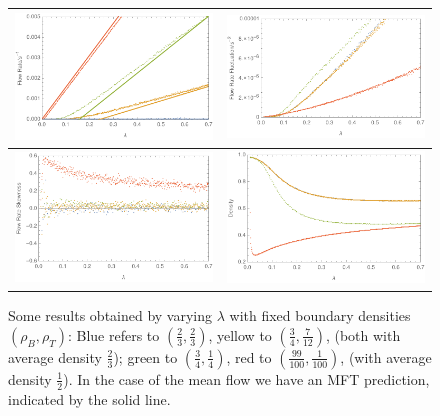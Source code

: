 \begin{figure}[h!]
\vspace{1em}
\caption{\label{fig:lambdaScans} Some results obtained by varying $\lambda$ with fixed boundary densities $(\rho_B, \rho_T)$: Blue refers to $(\frac{2}{3}, \frac{2}{3})$, yellow to $(\frac{3}{4}, \frac{7}{12})$, (both with average density $\frac{2}{3}$); green to
$(\frac{3}{4}, \frac{1}{4})$, red to $(\frac{99}{100}, \frac{1}{100})$, (with average density $\frac{1}{2}$). In the case of the mean flow we have an MFT prediction, indicated by the solid line.}
\begin{center}
 \begin{tabular}{c|c}
    \includegraphics[width=0.5\linewidth]{../tex-src/images/lambdaScan/flowMean} & \includegraphics[width=0.5\linewidth]{../tex-src/images/lambdaScan/flowVar} \\
    \hline
    \includegraphics[width=0.5\linewidth]{../tex-src/images/lambdaScan/flowSkew} & \includegraphics[width=0.5\linewidth]{../tex-src/images/lambdaScan/lambdaDens} \\
    \end{tabular}
\end{center}
    \vspace{-0em}
\end{figure}


